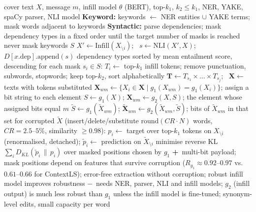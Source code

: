 \documentclass[10pt,a4paper,twocolumn]{article}
\newcommand{\pro}[1]{\Statex\textcolor{proc}{\textbf{+}\ #1}}
\newcommand{\con}[1]{\Statex\textcolor{conc}{\textbf{$-$}\ #1}}
\begin{document}
\begin{algorithm}[H]\small
\caption{Multi-bit watermark with invariant features (Yoo et al.\ 2023)}
\begin{algorithmic}[1]
\Require cover text $X$, message $m$, infill model $\theta$ (BERT), top-$k_1$, $k_2\le k_1$, NER, YAKE, spaCy parser, NLI model
 
 \State \textbf{Keyword:} keywords $\gets$ NER entities $\cup$ YAKE terms; mask words adjacent to keywords
 \State \textbf{Syntactic:} parse dependencies; mask dependency types in a fixed order until the target number of masks is reached
 \State never mask keywords \Return $S$
\EndFunction
{} 
  \State $X'\gets\mathrm{Infill}(X_{\setminus i})$; \ $s\gets\mathrm{NLI}(X',X)$; \ $D[x.\mathrm{dep}]\mathrm{.append}(s)$ \EndFor
 \State \Return dependency types sorted by mean entailment score, descending
\EndProcedure
{} 
 \State for each mask $s_i\in S$: $T_i\gets$ top-$k_1$ infill tokens; remove punctuation, subwords, stopwords; keep top-$k_2$, sort alphabetically
 \State $\mathbf T\gets T_{s_1}\times\dots\times T_{s_j}$; \ $\mathbf X\gets$ texts with tokens substituted
 \State $\mathbf X_{wm}\gets\{X_i\in\mathbf X\mid g_1(X_{wm})=g_1(X_i)\}$; assign a bit string to each element
\EndFunction
{} \State $S\gets g_1(X)$; $\mathbf X_{wm}\gets g_2(X,S)$; \Return the element whose assigned bits equal $m$ \EndProcedure
{} \State $\tilde S\gets g_1(\tilde X_{wm})$; $\tilde{\mathbf X}_{wm}\gets g_2(\tilde X_{wm},\tilde S)$; \Return bits of $\tilde X_{wm}$ in that set \EndProcedure
{}
 \State for corrupted $\tilde X$ (insert/delete/substitute $\mathrm{round}(CR\cdot N)$ words, $CR=2.5\text{--}5\%$, similarity $\ge0.98$): $p_i\gets$ target over top-$k_1$ tokens on $X_{\setminus i}$ (renormalised, detached); $\tilde p_i\gets$ prediction on $\tilde X_{\setminus i}$
 \State minimise reverse KL $\sum_i D_{KL}(\tilde p_i\,\|\,p_i)$ over masked positions chosen by $g_1$
\EndProcedure
\pro{multi-bit payload; mask positions depend on features that survive corruption ($R_{g_1}\approx0.92$--$0.97$ vs.\ $0.61$--$0.66$ for ContextLS); error-free extraction without corruption; robust infill model improves robustness}
\con{needs NER, parser, NLI and infill models; $g_2$ (infill output) is much less robust than $g_1$ unless the infill model is fine-tuned; synonym-level edits, small capacity per word}
\end{algorithmic}
\end{algorithm}
\end{document}
